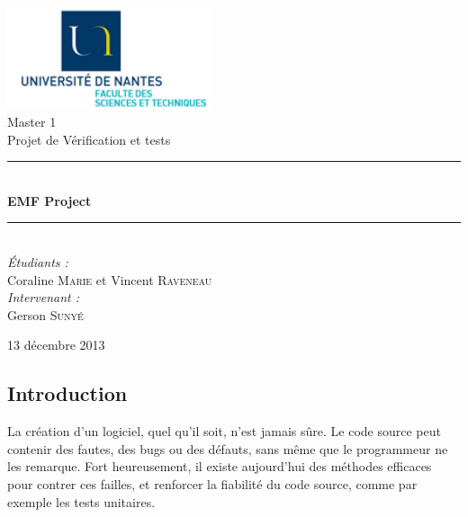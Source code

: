 \documentclass[a4paper]{article}
\newcommand{\HRule}{\rule{\linewidth}{0.5mm}}
\begin{document}
	\begin{titlepage}
		\begin{center}

			\includegraphics[width=0.45\textwidth]{UN-sciences.png}~\\[2cm]

			\LARGE{Master 1 }\\[1.5cm]

			\Large{Projet de Vérification et tests}\\[0.5cm]

			\HRule \\[0.4cm]
			{ \huge \bfseries EMF Project \\[0.4cm] }
			\HRule \\[1.5cm]

			\normalsize		
			\emph{\'Etudiants :}\\
			Coraline \textsc{Marie} et Vincent \textsc{Raveneau}\\
			\vspace{0.5cm}
			\emph{Intervenant :} \\
			Gerson \textsc{Sunyé}
		
			\vfill

			{\large 13 décembre 2013}

		\end{center}
	\end{titlepage}


	\renewcommand{\contentsname}{Sommaire}
	\tableofcontents
	\newpage


	\begin{center}
		\section{Introduction}
	\end{center}

	\vspace{0.5cm}

	La création d'un logiciel, quel qu'il soit, n'est jamais sûre. Le code source peut contenir des fautes, des bugs ou des défauts, sans même que le programmeur ne les remarque. Fort heureusement, il existe aujourd'hui des méthodes efficaces pour contrer ces failles, et renforcer la fiabilité du code source, comme par exemple les tests unitaires.
\end{document}
